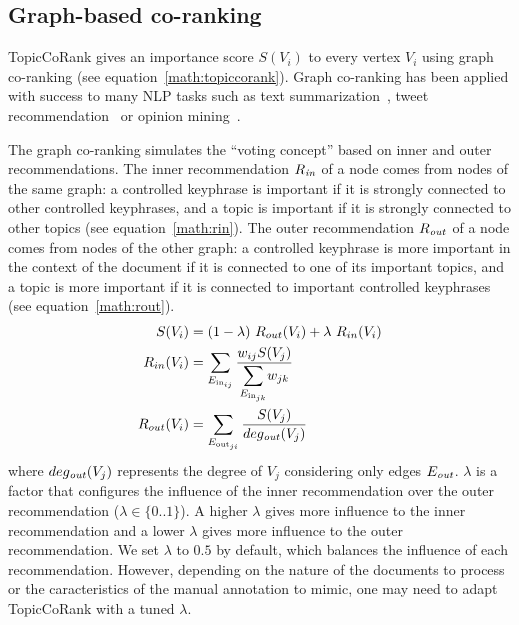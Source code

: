   \subsection{Graph-based co-ranking}
  \label{subsec:graph_based_co_ranking}
    TopicCoRank gives an importance score $S(V_i)$ to every vertex
    $V_i$ using graph co-ranking (see equation~\ref{math:topiccorank}).
    Graph co-ranking has been applied with success to many NLP tasks 
    such as text summarization~\cite{wan2011corankingsummarization}, 
    tweet recommendation~\cite{yan2012corankingtweetrecommendation} or 
    opinion mining~\cite{liu2014corankingopinionmining}.
    
    
    The
    graph co-ranking simulates the ``voting concept'' based on inner and outer
    recommendations. The inner recommendation $R_\textnormal{\textit{in}}$ of a
    node comes from nodes of the same graph: a controlled keyphrase is important if
    it is strongly connected to other controlled keyphrases, and a topic is important
    if it is strongly connected to other topics (see equation~\ref{math:rin}). The outer recommendation
    $R_\textnormal{\textit{out}}$ of a node comes from nodes of the other graph:
    a controlled keyphrase is more important in the context of the document if it is
    connected to one of its important topics, and a topic is more important if it
    is connected to important controlled keyphrases (see equation~\ref{math:rout}).
    \begin{align}
      S(V_i) &= (1 - \lambda)\ R_{out}(V_i) + \lambda\ R_{in}(V_i)\label{math:topiccorank}\\
      R_{in}(V_i) &= \sum_{E_{\text{in}_{ij}}}{\frac{w_{ij} S(V_j)}{\mathlarger\sum_{E_{\text{in}_{jk}}}{{w_{jk}}}}}\label{math:rin}\\
      R_{out}(V_i) &= \sum_{E_{\text{out}_{ji}}}{\frac{S(V_j)}{deg_{\text{\textit{out}}}(V_j)}}\label{math:rout}
    \end{align}
    where $deg_\textnormal{\textit{out}}(V_j)$ represents the degree of $V_j$
    considering only edges $E_\textnormal{\textit{out}}$.
    $\lambda$ is a factor that configures the influence of the inner recommendation
    over the outer recommendation ($\lambda \in \{0..1\}$). A higher $\lambda$
    gives more influence to the inner recommendation and a lower $\lambda$ gives
    more influence to the outer recommendation. We set $\lambda$ to $0.5$ by
    default, which balances the influence of each recommendation. However,
    depending on the nature of the documents to process or the caracteristics of
    the manual annotation to mimic, one may need to adapt TopicCoRank with a tuned
    $\lambda$.

